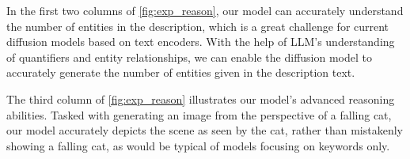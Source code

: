 In the first two columns of \cref{fig:exp_reason}, our model can accurately understand the number of entities in the description, which is a great challenge for current diffusion models based on text encoders. With the help of LLM's understanding of quantifiers and entity relationships, we can enable the diffusion model to accurately generate the number of entities given in the description text.

The third column of \cref{fig:exp_reason} illustrates our model’s advanced reasoning abilities. Tasked with generating an image from the perspective of a falling cat, our model accurately depicts the scene as seen by the cat, rather than mistakenly showing a falling cat, as would be typical of models focusing on keywords only.

